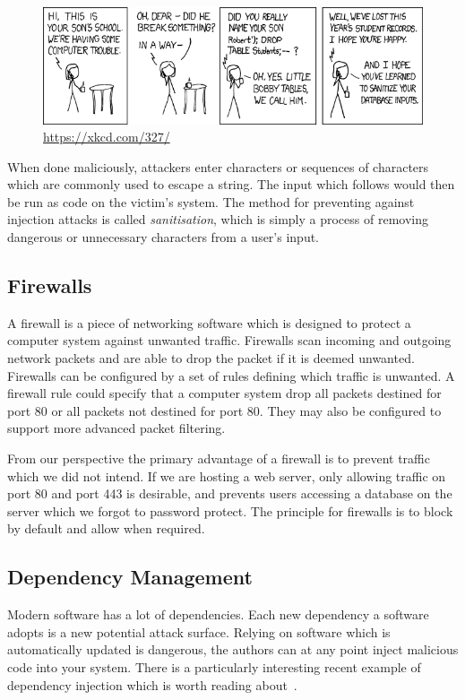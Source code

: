 \begin{figure}[ht]
\begin{center}
\includegraphics[width=\textwidth]{bobbytables.png}
\end{center}
\caption{\url{https://xkcd.com/327/}}
\end{figure}

When done maliciously, attackers enter characters or sequences of characters which are commonly used to escape a string.
The input which follows would then be run as code on the victim's system.
The method for preventing against injection attacks is called \textsl{sanitisation},
which is simply a process of removing dangerous or unnecessary characters from a user's input.

\subsection{Firewalls}
A firewall is a piece of networking software which is designed to protect a computer system against unwanted traffic.
Firewalls scan incoming and outgoing network packets and are able to drop the packet if it is deemed unwanted.
Firewalls can be configured by a set of rules defining which traffic is unwanted.
A firewall rule could specify that a computer system drop all packets destined for port 80 or all packets not destined for port 80.
They may also be configured to support more advanced packet filtering.

From our perspective the primary advantage of a firewall is to prevent traffic which we did not intend.
If we are hosting a web server, only allowing traffic on port 80 and port 443 is desirable,
and prevents users accessing a database on the server which we forgot to password protect.
The principle for firewalls is to block by default and allow when required.

\subsection{Dependency Management}
Modern software has a lot of dependencies.
Each new dependency a software adopts is a new potential attack surface.
Relying on software which is automatically updated is dangerous,
the authors can at any point inject malicious code into your system.
There is a particularly interesting recent example of dependency injection which is worth reading about~\cite{color-js}.

